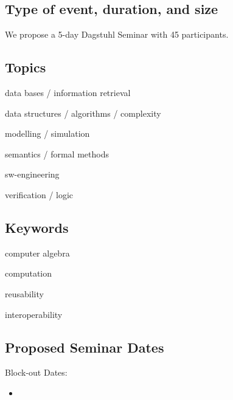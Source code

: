 \documentclass[a4paper,11pt]{article}
\begin{document}
\subsection{Type of event, duration, and size}

We propose a 5-day Dagstuhl Seminar with 45 participants.

\subsection{Topics}

\begin{compactitem}
 \item data bases / information retrieval
 \item data structures / algorithms / complexity
 \item modelling / simulation
 \item semantics / formal methods
 \item sw-engineering
 \item verification / logic
\end{compactitem}

\subsection{Keywords}

\begin{compactitem}
\item computer algebra
\item computation
\item reusability
\item interoperability
\end{compactitem}

\subsection{Proposed Seminar Dates}


Block-out Dates: 
\begin{itemize}
\item 
\end{itemize}
\end{document}
